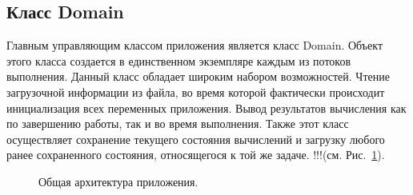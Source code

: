 \documentclass[a4paper, 14pt]{article}
\theoremstyle{definition}
\begin{document}
\newpage
\subsection{Класс Domain}

\par Главным управляющим классом приложения является класс Domain. Объект этого класса создается в единственном экземпляре каждым из потоков выполнения. Данный класс обладает широким набором возможностей. Чтение загрузочной информации из файла, во время которой фактически происходит инициализация всех переменных приложения. Вывод результатов вычисления как по завершению работы, так и во время выполнения. Также этот класс осуществляет сохранение текущего состояния вычислений и загрузку любого ранее сохраненного состояния, относящегося к той же задаче. !!!(см. Рис.~\ref{ris:all}).

\begin{figure}[h]
	\caption{Общая архитектура приложения.}
	\label{ris:all}
\end{figure}

\end{document}
